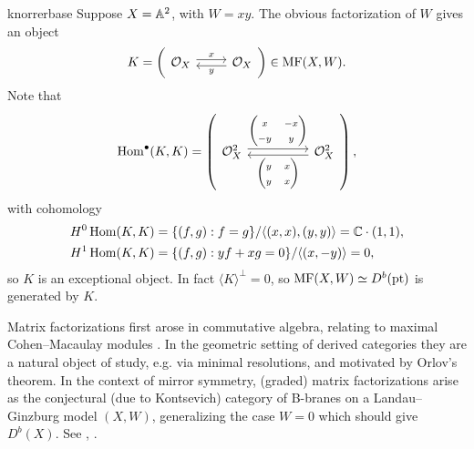 \begin{example}{}{knorrerbase}
     Suppose $X=\mathbb{A}^2$, with $W=xy$. The obvious factorization of $W$ gives an
     object
     \begin{equation*}
         K = \left(\begin{tikzcd}
             \O_X \ar[r,"x",shift left] &
             \O_X \ar[l,"y",shift left]
         \end{tikzcd}\right) \in\MF(X,W).
     \end{equation*}
     Note that
     \begin{equation*}
         \Hom^\bullet(K,K) =
         \left(\begin{tikzcd}[ampersand replacement=\&,column sep=huge]
                 \O_X^2 \ar[shift left]{r}{\begin{pmatrix}
                     x & -x \\ -y & y
                 \end{pmatrix}} \&
                 \O_X^2 \ar[shift left]{l}{\begin{pmatrix}
                     y & x \\ y & x
                 \end{pmatrix}}
         \end{tikzcd}\right),
     \end{equation*}
     with cohomology
     \begin{align*}
         H^0\operatorname{Hom}(K,K) &= \{(f,g):f=g\}/\langle(x,x),(y,y)\rangle
             = \mathbb{C}\cdot(1,1), \\
         H^1\operatorname{Hom}(K,K) &= \{(f,g):yf+xg=0\}/\langle(x,-y)\rangle
             = 0,
     \end{align*}
     so $K$ is an exceptional object. In fact $\langle K\rangle^\perp=0$, so
     $\mathrm{MF}(X,W)\simeq D^b(\mathrm{pt})$ is generated by $K$. %
\end{example}

\begin{remark}{}{}
    Matrix factorizations first arose in commutative algebra, relating to
    maximal Cohen--Macaulay modules \cite{Eisenbud}. In the geometric setting of
    derived categories they are a natural object of study, e.g. via minimal
    resolutions, and motivated by Orlov's theorem. In the context of mirror
    symmetry, (graded) matrix factorizations arise as the conjectural (due to
    Kontsevich) category of B-branes on a Landau--Ginzburg model $(X,W)$,
    generalizing the case $W=0$ which should give $D^b(X)$. See
    \cite{OrlovTheorem}, \cite{Ed}.
\end{remark}

